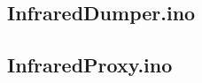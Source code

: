 \documentclass[10pt]{article}
\newcommand{\mylisting}[2][]{%
}
\begin{document}
\subsection{InfraredDumper.ino}
	\mylisting[language=C]{../example/InfraredDumper/InfraredDumper.ino}
\newpage
\subsection{InfraredProxy.ino}
	\mylisting[language=C]{../example/InfraredProxy/InfraredProxy.ino}
	
\end{document}
